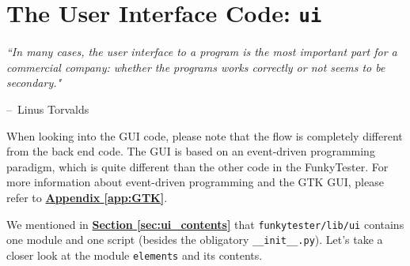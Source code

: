 \documentclass{report}
\makeatletter
\newenvironment{chapquote}[2][2em]
  {\setlength{\@tempdima}{#1}%
   \def\chapquote@author{#2}%
   \parshape 1 \@tempdima \dimexpr\textwidth-2\@tempdima\relax%
   \itshape}
  {\par\normalfont\hfill--\ \chapquote@author\hspace*{\@tempdima}\par\bigskip}
\makeatother
\begin{document}
	\begin{minipage}{\linewidth}
		\label{fig:ft_comm}
	\end{minipage} 
	\vspace{5pt}		%

\chapter{The User Interface Code: \texttt{ui}} \label{sec:ui}
\begin{chapquote}{Linus Torvalds \textit{}}
``In many cases, the user interface to a program is the most important part for a commercial company: whether the programs works correctly or not seems to be secondary."
\end{chapquote}
When looking into the GUI code, please note that the flow is completely different from the back end code. The GUI is based on an event-driven programming paradigm, which is quite different than the other code in the FunkyTester. For more information about event-driven programming and the GTK GUI, please refer to \hyperref[app:GTK]{\textbf{Appendix \ref{app:GTK}}}.

We mentioned in \hyperref[sec:ui_contents]{\textbf{Section \ref{sec:ui_contents}}} that \texttt{funkytester/lib/ui} contains one module and one script (besides the obligatory \texttt{\_\_init\_\_.py}). Let's take a closer look at the module \texttt{elements} and its contents.
\end{document}
